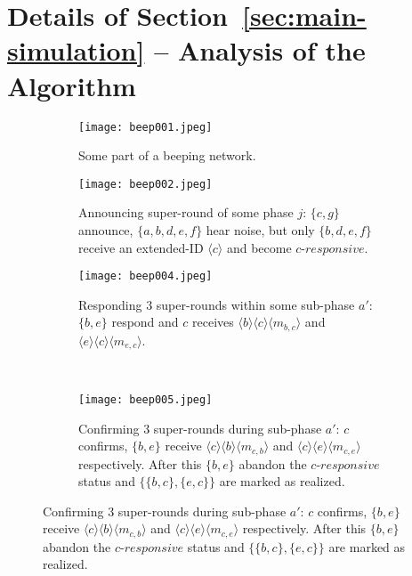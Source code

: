 
\section{Details of Section~\ref{sec:main-simulation} -- Analysis of the \alg Algorithm}
\label{sec:proofs-main-simulation}



\begin{figure}[thbp]
\centering
\begin{subfigure}[htbp]{0.30\textwidth}
\centering
\vspace*{-10ex}
\texttt{[image: beep001.jpeg]}
\caption{Some part of a beeping network.}
\label{subfig:bn}
\end{subfigure}
\hspace{0.1in}
\begin{subfigure}[htbp]{0.30\textwidth}
\centering
\texttt{[image: beep002.jpeg]}
\caption{Announcing super-round of some phase $j$: $\{c,g\}$ announce, $\{a,b,d,e,f\}$ hear noise, but only $\{b,d,e,f\}$ receive an extended-ID $\langle c\rangle$ and become $c$-$responsive$.}
\label{subfig:announce}
\end{subfigure}
\hspace{0.1in}
\begin{subfigure}[htbp]{0.30\textwidth}
\centering
\vspace*{-3ex}
\texttt{[image: beep004.jpeg]}
\caption{Responding $3$ super-rounds within some sub-phase $a'$: $\{b,e\}$ respond and $c$ receives $\langle b\rangle\langle c\rangle\langle m_{b,c}\rangle$ and $\langle e\rangle\langle c\rangle\langle m_{e,c}\rangle$.}
\label{subfig:resp1}
\end{subfigure}
\\
\begin{subfigure}[htbp]{0.30\textwidth}
\centering
\vspace*{3ex}
\texttt{[image: beep005.jpeg]}
\caption{Confirming $3$ super-rounds during sub-phase $a'$: $c$ confirms, $\{b,e\}$ receive $\langle c\rangle\langle b\rangle\langle m_{c,b}\rangle$ and $\langle c\rangle\langle e\rangle\langle m_{c,e}\rangle$ respectively. After this $\{b,e\}$ abandon the $c$-$responsive$ status and $\{\{b,c\},\{e,c\}\}$ are marked as realized.}

\end{subfigure}
\end{figure}
